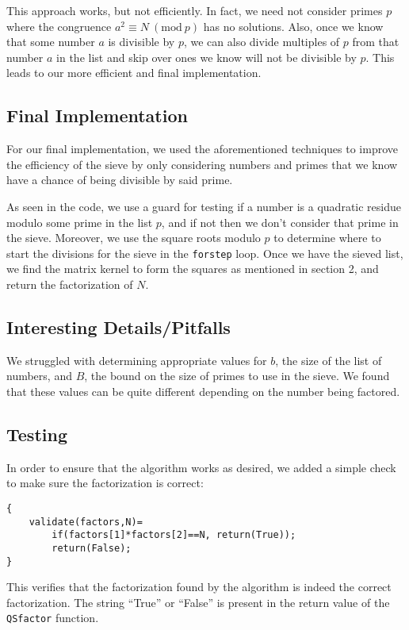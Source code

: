 \documentclass[titlepage]{article}
\newcommand{\Mod}[1]{\ (\text{mod}\ #1)}
\begin{document}
		This approach works, but not efficiently. In fact, we need not consider primes $p$ where the congruence $a^2 \equiv N \Mod{p}$ has no solutions. Also, once we know that some number $a$ is divisible by $p$, we can also divide multiples of $p$ from that number $a$ in the list and skip over ones we know will not be divisible by $p$. This leads to our more efficient and final implementation.
	
		\subsection{Final Implementation}
		For our final implementation, we used the aforementioned techniques to improve the efficiency of the sieve by only considering numbers and primes that we know have a chance of being divisible by said prime.
		
		As seen in the code, we use a guard for testing if a number is a quadratic residue modulo some prime in the list $p$, and if not then we don't consider that prime in the sieve. Moreover, we use the square roots modulo $p$ to determine where to start the divisions for the sieve in the \verb|forstep| loop. Once we have the sieved list, we find the matrix kernel to form the squares as mentioned in section 2, and return the factorization of $N$.
	
		\subsection{Interesting Details/Pitfalls}
		We struggled with determining appropriate values for $b$, the size of the list of numbers, and $B$, the bound on the size of primes to use in the sieve. We found that these values can be quite different depending on the number being factored.
	
		\subsection{Testing}
		In order to ensure that the algorithm works as desired, we added a simple check to make sure the factorization is correct:
\begin{lstlisting}
{
	validate(factors,N)=
		if(factors[1]*factors[2]==N, return(True));
		return(False);
}
\end{lstlisting}
	
	This verifies that the factorization found by the algorithm is indeed the correct factorization. The string ``True'' or ``False'' is present in the return value of the \verb|QSfactor| function.
	
\end{document}
